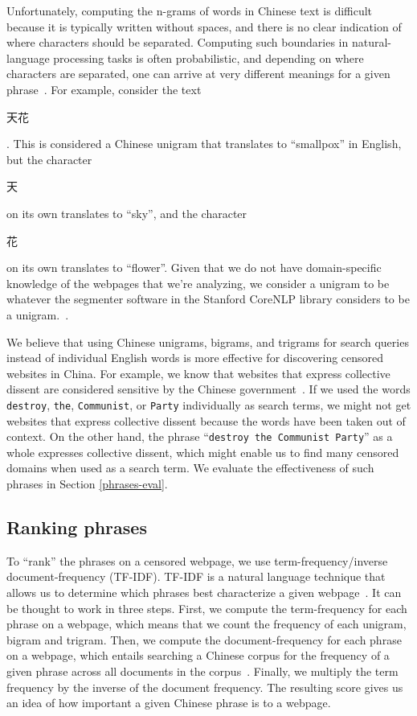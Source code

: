 Unfortunately, computing the n-grams of words in Chinese text is
difficult because it is typically written without spaces, and there is
no clear indication of where characters should be separated. Computing
such boundaries in natural-language processing tasks is often
probabilistic, and depending on where characters are separated, one
can arrive at very different meanings for a given
phrase~\cite{stanford:segmenter}. For example, consider the
text \begin{CJK*}{UTF8}{gbsn}天花\end{CJK*}. This is considered a
Chinese unigram that translates to
``smallpox'' in English, but the character \begin{CJK*}{UTF8}{gbsn}
天\end{CJK*} on its own translates to ``sky'', and the
character \begin{CJK*}{UTF8}{gbsn}花\end{CJK*} on its own translates
to ``flower''. Given that we do not have domain-specific knowledge of
the webpages that we're analyzing, we consider a unigram to be
whatever the segmenter software in the Stanford CoreNLP library considers to be
a unigram.~\cite{tseng2005conditional, chang2008optimizing}.

We believe that using Chinese unigrams, bigrams, and trigrams for search queries
instead of individual English words is more effective for discovering
censored websites in China. For example, we know that websites that
express collective dissent are considered sensitive by the Chinese
government~\cite{king2013censorship}. If we used the words
\texttt{destroy}, \texttt{the}, \texttt{Communist}, or \texttt{Party}
individually as search terms, we might not get websites that express
collective dissent because the words have been taken out of
context. On the other hand, the phrase ``\texttt{destroy the Communist
Party}'' as a whole expresses collective dissent, which might enable us
to find many censored domains when used as a search term. We evaluate
the effectiveness of such phrases in Section \ref{phrases-eval}.

\subsection{Ranking phrases} \label{tf-idf}
To ``rank'' the phrases on a censored webpage, we use
term-frequency/inverse document-frequency (TF-IDF). TF-IDF is a
natural language technique that allows us to determine which phrases
best characterize a given webpage~\cite{ramos2003using}. It can be
thought to work in three steps. First, we compute the term-frequency
for each phrase on a webpage, which means that we count the frequency
of each unigram, bigram and trigram. Then, we compute the document-frequency
for each phrase on a webpage, which entails searching a Chinese corpus
for the frequency of a given phrase across all documents in the
corpus~\cite{phrasefinder}. Finally, we multiply the term frequency by
the inverse of the document frequency. The resulting score gives us an
idea of how important a given Chinese phrase is to a webpage.

